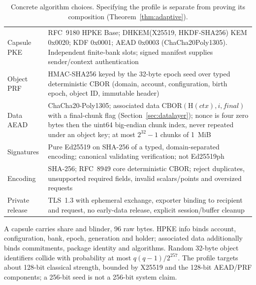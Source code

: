 \documentclass[pdflatex,sn-mathphys-num]{sn-jnl}%
\theoremstyle{plain}
\theoremstyle{definition}
\begin{document}
\begin{table}[htbp]
\caption{Concrete algorithm choices. Specifying the profile is separate from proving its composition (Theorem~\ref{thm:adaptive}).}\label{tab:profile}
\centering\footnotesize
\altrows
\begin{tabularx}{\linewidth}{@{}p{.27\linewidth}Y@{}}\toprule
{} & \\\midrule
Capsule PKE & RFC~9180 HPKE Base; DHKEM(X25519, HKDF-SHA256) KEM 0x0020; KDF 0x0001; AEAD 0x0003 (ChaCha20Poly1305). Independent finite-bank slots; signed manifest supplies sender/context authentication~\cite{rfc9180}\\
Object PRF & HMAC-SHA256 keyed by the 32-byte epoch seed over typed deterministic CBOR (domain, account, configuration, birth epoch, object ID, immutable header)\\
Data AEAD & ChaCha20-Poly1305; associated data CBOR$(\mathrm{H}(\mathit{ctx}),i,\mathit{final})$ with a final-chunk flag (Section~\ref{sec:datalayer}); nonce is four zero bytes then the uint64 big-endian chunk index, never repeated under an object key; at most $2^{32}-1$ chunks of 1~MiB~\cite{rfc8439}\\
Signatures & Pure Ed25519 on SHA-256 of a typed, domain-separated encoding; canonical validating verification; not Ed25519ph~\cite{rfc8032}\\
Encoding & SHA-256; RFC~8949 core deterministic CBOR; reject duplicates, unsupported required fields, invalid scalars/points and oversized requests~\cite{rfc8949}\\
Private release & TLS~1.3 with ephemeral exchange, exporter binding to recipient and request, no early-data release, explicit session/buffer cleanup~\cite{rfc8446}\\\bottomrule
\end{tabularx}
\end{table}

A capsule carries share and blinder, 96 raw bytes. HPKE info binds account, configuration, bank, epoch, generation and holder; associated data additionally binds commitments, package identity and algorithms. Random 32-byte object identifiers collide with probability at most $q(q-1)/2^{257}$. The profile targets about 128-bit classical strength, bounded by X25519 and the 128-bit AEAD/PRF components; a 256-bit seed is not a 256-bit system claim.
\end{document}
